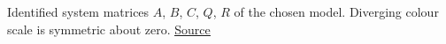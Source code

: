 Identified system matrices $A$, $B$, $C$, $Q$, $R$ of the chosen model. Diverging colour scale is symmetric about zero. \href{https://github.com/tahmidazam/gg4/blob/main/notebooks/id/id.ipynb}{\underline{Source}}%